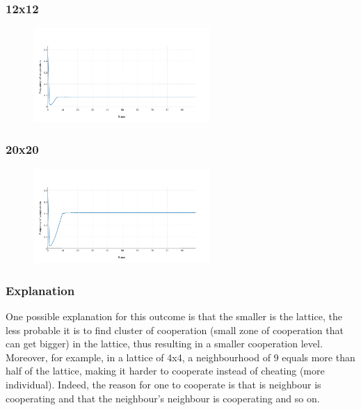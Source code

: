 \documentclass[11pt]{article}
\begin{document}
\subsubsection{12x12}

\begin{figure}[H]
\centering
   \includegraphics[width=0.6\textwidth]{img/part1/cf-moore-12-12.png}
\end{figure}

\subsubsection{20x20}

\begin{figure}[H]
\centering
   \includegraphics[width=0.6\textwidth]{img/part1/cf-moore-20-20.png}
\end{figure}

\subsubsection{Explanation}

One possible explanation for this outcome is that the smaller is the lattice, the less probable it is to find cluster of cooperation (small zone of cooperation that can get bigger) in the lattice, thus resulting in a smaller cooperation level. Moreover, for example, in a lattice of 4x4, a neighbourhood of 9 equals more than half of the lattice, making it harder to cooperate instead of cheating (more individual). Indeed, the reason for one to cooperate is that is neighbour is cooperating and that the neighbour's neighbour is cooperating and so on.
\end{document}
